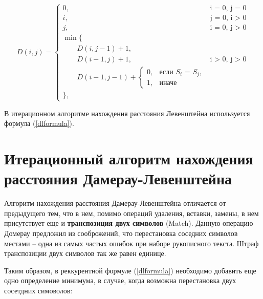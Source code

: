 \documentclass[12pt]{report}
\begin{document}
	\begin{equation}
	\label{dlformula}
	D(i, j) = \begin{cases}
		
		0, &\text{i = 0, j = 0}\\
		i, &\text{j = 0, i > 0}\\
		j, &\text{i = 0, j > 0}\\
		\min \lbrace \\
		\qquad D(i, j-1) + 1,\\
		\qquad D(i-1, j) + 1, &\text{i > 0, j > 0}\\
		\qquad D(i-1, j-1) + \begin{cases}
                        		0, &\text{если $S_{i}$ = $S_{j}$,}\\
                        		1, &\text{иначе}
                        	\end{cases}\\
		\rbrace,
	\end{cases}
	\end{equation}
	
	В итерационном алгоритме нахождения расстояния Левенштейна используется формула (\ref{dlformula}).
	
	
	\section{Итерационный алгоритм нахождения расстояния Дамерау-Левенштейна}
	
	Алгоритм нахождения расстояния Дамерау-Левенштейна отличается от предыдущего тем, что в нем, помимо операций удаления, вставки, замены, в нем присутствует еще и \textbf{транспозиция двух символов} (Match). Данную операцию Домерау предложил из сооброжений, что перестановка соседних символов местами -- одна из самых частых ошибок при наборе рукописного текста. Штраф транспозиции двух символов так же равен единице.
	
	Таким образом, в реккурентной формуле (\ref{dlformula}) необходимо добавить еще одно определение минимума, в случае, когда возможна перестановка двух сосетдних симоволов:
	
\end{document}
